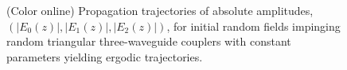 \documentclass[9pt,twocolumn,twoside]{osajnl}
\begin{document}
\begin{figure}[htbp]
	\centering
	\caption{(Color online) Propagation trajectories of absolute amplitudes, $(\vert E_{0}(z) \vert, \vert E_{1}(z) \vert, \vert E_{2}(z) \vert )$, for initial random fields impinging random triangular three-waveguide couplers with constant parameters yielding ergodic trajectories.}
	\label{fig:Fig6}
\end{figure}
\end{document}
